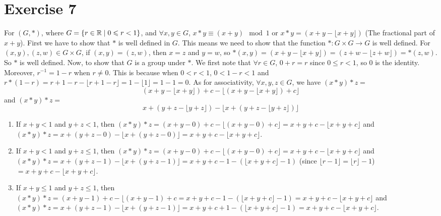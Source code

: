 \documentclass[12pt]{article}
\begin{document}
    \section*{Exercise 7}
    For $(G, \ast)$, where $G = \{r \in \mathbb{R} \mid 0 \leqslant r < 1\}$,
    and $\forall x, y \in G$, 
    $x \ast y \equiv (x + y) \mod{1}$
    or $x \ast y = (x + y - \lfloor x + y \rfloor)$
    (The fractional part of $x + y$).
    First we have to show that $\ast$ is well defined in $G$. 
    This means we need to show that the function $\ast:G \times G \to G$
    is well defined.
    For $(x, y), (z, w) \in G \times G$,
    if $(x, y) = (z, w)$,
    then $x = z$ and $y = w$,
    so $\ast(x, y) 
    = (x + y - \lfloor x + y \rfloor) 
    = (z + w - \lfloor z + w \rfloor) 
    = \ast(z, w)$.
    So $\ast$ is well defined.
    Now, to show that $G$ is a group under $\ast$.
    We first note that $\forall r \in G$, $0 + r = r$
    since $0 \leqslant r < 1$,
    so $0$ is the identity.
    Moreover, $r^{-1} = 1 - r$
    when $r \neq 0$.
    This is because when $0 < r < 1$, $0 < 1 - r < 1$
    and $r \ast (1 - r) 
    = r + 1 - r - \lfloor r + 1 - r \rfloor 
    = 1 - \lfloor 1 \rfloor 
    = 1 - 1 = 0$.
    As for associativity, $\forall x, y, z \in G$,
    we have $(x \ast y) \ast z = $
    \[(x + y - \lfloor x + y \rfloor) + c -
    \lfloor (x + y - \lfloor x + y \rfloor) + c \rfloor\]
    and $(x \ast y) \ast z = $
    \[x + (y + z - \lfloor y + z \rfloor)
    - \lfloor x + (y + z - \lfloor y + z \rfloor) \rfloor\] 
    \begin{enumerate}[label=\textbf{case \arabic*:}]
        \item
            If $x + y < 1$ and $y + z < 1$,
            then $(x \ast y) \ast z 
            = (x + y - 0) + c - \lfloor (x + y - 0) + c \rfloor
            = x + y + c - \lfloor x + y + c \rfloor$
            and $(x \ast y) \ast z 
            = x + (y + z - 0) - \lfloor x + (y + z - 0) \rfloor
            = x + y + c - \lfloor x + y + c \rfloor$.
        \item
            If $x + y < 1$ and $y + z \leqslant 1$,
            then $(x \ast y) \ast z 
            = (x + y - 0) + c - \lfloor (x + y - 0) + c \rfloor
            = x + y + c - \lfloor x + y + c \rfloor$
            and $(x \ast y) \ast z 
            = x + (y + z - 1) - \lfloor x + (y + z - 1) \rfloor
            = x + y + c - 1 - (\lfloor x + y + c \rfloor - 1)$ 
            (since $\lfloor r - 1 \rfloor = \lfloor r \rfloor - 1$)
            $ = x + y + c - \lfloor x + y + c \rfloor$.
        \item
            If $x + y \leqslant 1$ and $y + z \leqslant 1$,
            then $(x \ast y) \ast z
            = (x + y - 1) + c - \lfloor (x + y - 1) + c
            = x + y + c - 1 - (\lfloor x + y + c \rfloor - 1)
            = x + y + c - \lfloor x + y + c \rfloor$
            and $(x \ast y) \ast z
            = x + (y + z - 1) - \lfloor x + (y + z - 1) \rfloor
            = x + y + c + 1 - (\lfloor x + y + c \rfloor - 1)
            = x + y + c - \lfloor x + y + c \rfloor$.
    \end{enumerate}
\end{document}
